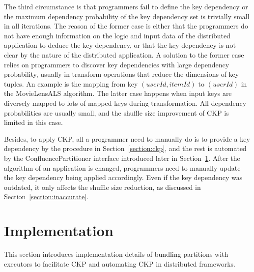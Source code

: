 \documentclass[10pt,journal,compsoc]{IEEEtran}
\begin{document}
The third circumstance is that programmers fail to define the key dependency 
or the maximum dependency probability of the key dependency set 
is trivially small in all iterations. 
The reason of the former case is either that 
the programmers do not have enough information on the logic and input data of the distributed application to deduce the key dependency, 
or that the key dependency is not clear by the nature of the distributed application. 
A solution to the former case relies on programmers to discover 
key dependencies with large dependency probability, 
usually in transform operations that reduce the dimensions of key tuples. 
An example is the mapping from key $(userId, itemId)$ to $(userId)$ in the 
MovieLensALS algorithm.
The latter case happens when input keys are diversely mapped to lots of mapped
keys during transformation. 
All dependency probabilities are usually small, and the shuffle size improvement 
of CKP is limited in this case. 

Besides, to apply CKP, all a programmer need to manually do is to provide a key 
dependency by the procedure in Section~\ref{section:ckp}, and the rest is automated by the ConfluencePartitioner interface
introduced later in Section~\ref{section:implement}. 
After the algorithm of an application is changed, programmers need 
to manually update the key dependency being applied accordingly. 
Even if the key dependency was outdated, it only affects the shuffle size 
reduction, as discussed in Section~\ref{section:inaccurate}. 

\section{Implementation}\label{section:implement}
This section introduces implementation details of bundling partitions
with executors to facilitate CKP and automating CKP in distributed
frameworks.

\end{document}
